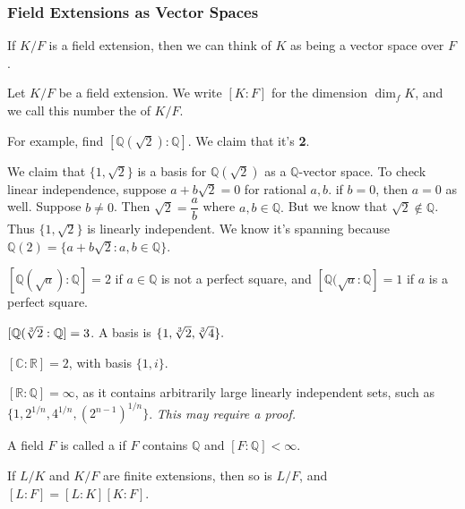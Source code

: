 \documentclass{scrartcl}
\begin{document}
\subsubsection{Field Extensions as Vector Spaces}
If $K/F$ is a field extension, then we can think of $K$ as being a vector space over $F$.

\begin{definition}
    Let $K/F$ be a field extension. We write $[K:F]$ for the dimension $\dim_f K$, and we call this number the  of $K/F$.
\end{definition}

For example, find $[\mathbb{Q} (\sqrt{2}) : \mathbb{Q}]$. We claim that it's \textbf{2}.

We claim that $\{1, \sqrt{2}\}$ is a basis for $\mathbb{Q}(\sqrt{2})$ as a $\mathbb{Q}$-vector space. To check linear independence, suppose $a + b\sqrt{2} = 0$ for rational $a,b$. if $b=0$, then $a=0$ as well. Suppose $b \ne 0$. Then $\sqrt{2} = \dfrac{a}{b}$ where $a, b \in \mathbb{Q}.$ But we know that $\sqrt{2} \not\in \mathbb{Q}$. Thus $\{1, \sqrt{2}\}$ is linearly independent. We know it's spanning because $\mathbb{Q}(2) = \{ a+b\sqrt{2} : a,b \in \mathbb{Q} \}$.

$[\mathbb{Q}(\sqrt{a}) : \mathbb{Q}] = 2$ if $a \in \mathbb{Q}$ is not a perfect square, and $[\mathbb{Q}(\sqrt{a} : \mathbb{Q}] = 1$ if $a$ is a perfect square.

$[\mathbb{Q}(\sqrt[3]{2} : \mathbb{Q}] = 3$. A basis is $\{1, \sqrt[3]{2}, \sqrt[3]{4} \}.$

$[\mathbb{C} : \mathbb{R}] = 2$, with basis $\{1, i\}$. 

$[\mathbb{R} : \mathbb{Q}] = \infty$, as it contains arbitrarily large linearly independent sets, such as $\{1, 2^{1/n}, 4^{1/n}, (2^{n-1})^{1/n}\}$. \textit{This may require a proof.}

\begin{definition} A field $F$ is called a  if $F$ contains $\mathbb{Q}$ and $[F : \mathbb{Q}] < \infty$.
\end{definition}

\begin{theorem}
    If $L/K$ and $K/F$ are finite extensions, then so is $L/F$, and $[L:F] = [L:K][K:F]$.
\end{theorem}
\end{document}
